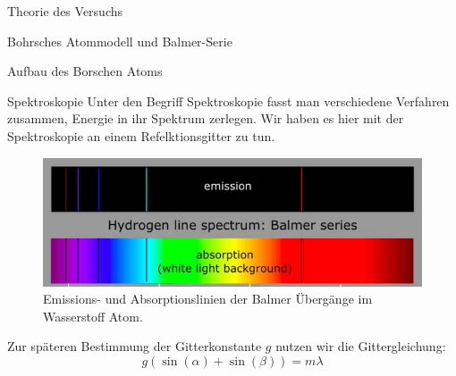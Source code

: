 \documentclass[pdftex, a4paper,11pt, twoside, ngerman]{report}
\begin{document}
\begin{chapter}{Theorie des Versuchs}
\begin{section}{Bohrsches Atommodell und Balmer-Serie}
\begin{subsection}{Aufbau des Borschen Atoms}
        
      \end{subsection}
      
      
      
      \begin{subsection}{Spektroskopie}
        \label{chp:TheorieBohrBalmerSerieSpektroskopie}
        Unter den Begriff Spektroskopie fasst man verschiedene Verfahren
        zusammen, Energie in ihr Spektrum zerlegen.
        Wir haben es hier mit der Spektroskopie an einem Refelktionsgitter zu
        tun.
        \begin{figure}[b]
          \begin{center}
            \includegraphics[width=.95\textwidth]
                {Figures/BalmerserieEmissionAbsorption.png}
            \caption{Emissions- und Absorptionslinien der Balmer Übergänge im 
                Wasserstoff Atom.
                \cite{bib:BalmerserieEmissionAbsorption}}
            \label{fig:BalmerserieEmissionAbsorption}
          \end{center}
        \end{figure}
        Zur späteren Bestimmung der Gitterkonstante $g$ nutzen wir die
        Gittergleichung:
        \begin{equation}
          \label{eq:Gittergleichung}
          g(\sin(\alpha)+\sin(\beta))=m\lambda
        \end{equation}
        

\end{subsection}
\end{section}
\end{chapter}
\end{document}
